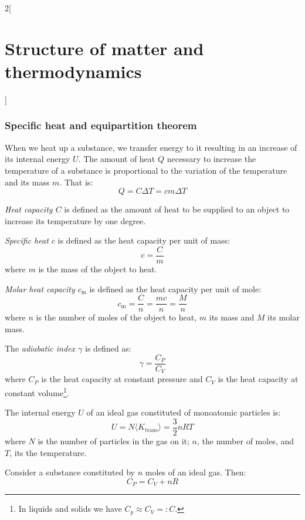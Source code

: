 \documentclass[../../../main.tex]{subfiles}
\begin{document}
\begin{multicols}{2}[\section{Structure of matter and thermodynamics}]
    \subsubsection*{Specific heat and equipartition theorem}
    \begin{definition}
        When we heat up a substance, we transfer energy to it resulting in an increase of its internal energy $U$. The amount of heat $Q$ necessary to increase the temperature of a substance is proportional to the variation of the temperature and its mass $m$. That is:
        $$Q=C\Delta T=cm\Delta T$$
    \end{definition}
    \begin{definition}
        \textit{Heat capacity $C$} is defined as the amount of heat to be supplied to an object to increase its temperature by one degree.
    \end{definition}
    \begin{definition}
        \textit{Specific heat $c$} is defined as the heat capacity per unit of mass: $$c=\frac{C}{m}$$ where $m$ is the mass of the object to heat.
    \end{definition}
    \begin{definition}
        \textit{Molar heat capacity $c_\text{m}$} is defined as the heat capacity per unit of mole: $$c_\text{m}=\frac{C}{n}=\frac{mc}{n}=\frac{M}{n}$$ where $n$ is the number of moles of the object to heat, $m$ its mass and $M$ its molar mass.
    \end{definition}
    \begin{definition}
        The \textit{adiabatic index $\gamma$} is defined as:
        $$\gamma=\frac{C_P}{C_V}$$
        where $C_P$ is the heat capacity at constant pressure and $C_V$ is the heat capacity at constant volume\footnote{In liquids and solids we have $C_p\approx C_V=:C$.}.
    \end{definition}
    \begin{definition}
        The internal energy $U$ of an ideal gas constituted of monoatomic particles is:
        $$U=N\langle K_\text{trans}\rangle=\frac{3}{2}nRT$$
        where $N$ is the number of particles in the gas on it; $n$, the number of moles, and $T$, its the temperature.
    \end{definition}
    \begin{prop}
        Consider a substance constituted by $n$ moles of an ideal gas. Then:
        $$C_P=C_V+nR$$
    \end{prop}
    \begin{prop}

\end{prop}
\end{multicols}
\end{document}
